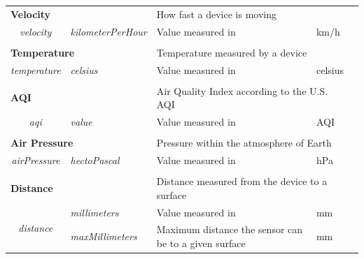\begin{landscape}
\begin{longtable}{cllll}
   \\[-0.85em]
   \multicolumn{2}{l}{\textbf{Velocity}}                                      & \multicolumn{2}{l}{How fast a device is moving}                                         &  \\
   \textit{velocity}                     & \textit{kilometerPerHour}          & Value measured in                                      & km/h                           &  \\ [0.4em] \cline{1-4}
   \\[-0.85em]
   \multicolumn{2}{l}{\textbf{Temperature}}                                   & \multicolumn{2}{l}{Temperature measured by a device}                                    &  \\
   \textit{temperature}                  & \textit{celsius}                   & Value measured in                                      & celsius                        &  \\ [0.4em] \cline{1-4}
   \\[-0.85em]
   \multicolumn{2}{l}{\textbf{AQI}}                                           & \multicolumn{2}{l}{Air Quality Index according to the U.S. AQI}                         &  \\
   \textit{aqi}                          & \textit{value}                     & Value measured in                                      & AQI                            &  \\ [0.4em] \cline{1-4}
   \\[-0.85em]
   \multicolumn{2}{l}{\textbf{Air Pressure}}                                  & \multicolumn{2}{l}{Pressure within the atmosphere of Earth}                             &  \\
   \textit{airPressure}                  & \textit{hectoPascal}               & Value measured in                                      & hPa                            &  \\ [0.4em] \cline{1-4}
   \\[-0.85em]
   \multicolumn{2}{l}{\textbf{Distance}}                                      & \multicolumn{2}{l}{Distance measured from the device to a surface}                      &  \\
   \multirow{3}{*}{\textit{distance}}    & \textit{millimeters}               & Value measured in                                      & mm                             &  \\
                                         & \textit{maxMillimeters}            & Maximum distance the sensor can be to a given surface  & mm                             &  \\

\end{longtable}
\end{landscape}
